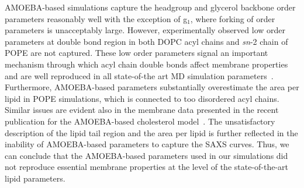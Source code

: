 \documentclass[journal=jctcce,manuscript=article,layout=singlecolumn]{achemso}
\begin{document}
 AMOEBA-based simulations capture the headgroup and glycerol backbone order parameters reasonably well with the exception of g$_1$,
where forking of order parameters is unacceptably large. However, experimentally observed low order parameters at double bond region in both DOPC acyl chains and {\it sn}-2 chain of POPE are not captured. These low order parameters signal an important mechanism through which acyl chain double bonds affect membrane properties~\cite{ollila07} and are well reproduced in all state-of-the art MD simulation parameters~\cite{ollila16}. Furthermore, AMOEBA-based parameters substantially overestimate the area per lipid in POPE simulations, which is connected to too disordered acyl chains. Similar issues are evident also in the membrane data presented in the recent publication for the AMOEBA-based cholesterol model~\cite{Li23chol}.
%
%
The unsatisfactory description of the lipid tail region and the area per lipid is further reflected in the inability of AMOEBA-based parameters to capture the SAXS curves. Thus, we can conclude that the AMOEBA-based parameters used in our simulations did not reproduce essential
membrane properties at the level of the state-of-the-art lipid parameters. 
\end{document}
